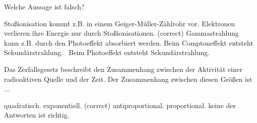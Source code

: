\documentclass[11pt]{exam}
\begin{document}
\begin{questions}
\vspace{3mm}\question Welche Aussage ist falsch?

\begin{choices}
	\choice Stoßionisation kommt z.B. in einem Geiger-Müller-Zählrohr vor.
	\choice Elektronen verlieren ihre Energie nur durch Stoßionisationen. (correct)
	\choice Gammastrahlung kann z.B. durch den Photoeffekt absorbiert werden.
	\choice Beim Comptoneffekt entsteht Sekundärstrahlung.
	\choice  Beim Photoeffekt entsteht Sekundärstrahlung.
\end{choices}

\vspace{3mm}\question Das Zerfallsgesetz beschreibt den Zusammenhang zwischen der Aktivität einer radioaktiven Quelle und der Zeit. Der Zusammenhang zwischen diesen Größen ist ...

\begin{choices}
	\choice quadratisch.
	\choice exponentiell. (correct)
	\choice antiproportional.
	\choice proportional.
	\choice keine der Antworten ist richtig.
\end{choices}

\vspace{3mm}\end{questions}
\end{document}

